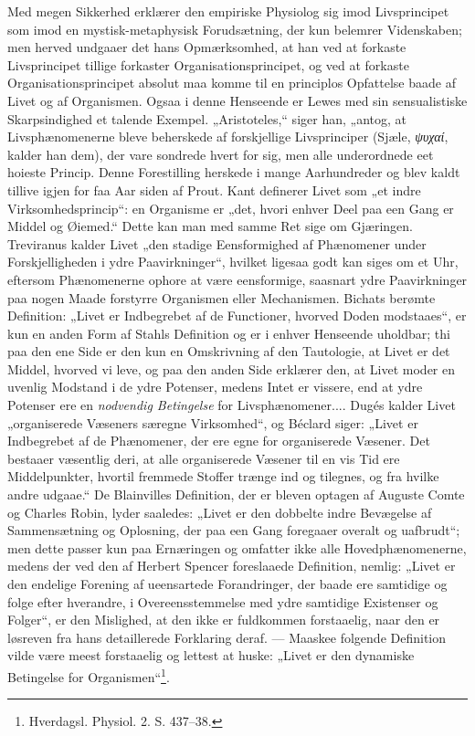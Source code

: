 \documentclass[11pt]{book}
\newcommand{\opage}[1]{\marginnote{\footnotesize\textit{[#1]}}}
\begin{document}
Med megen Sikkerhed erklærer den empiriske Physiolog sig imod
Livsprincipet som imod en mystisk-metaphysisk Forudsætning, der kun
belemrer Videnskaben; men herved undgaaer det hans Opmærksomhed,
at han ved at forkaste Livsprincipet tillige forkaster
Organisationsprincipet, og ved at
\opage{348} \setcounter{footnote}{0}%
forkaste Organisationsprincipet absolut maa komme til en principlos
Opfattelse baade af Livet og af Organismen. Ogsaa i denne Henseende
er Lewes med sin sensualistiske Skarpsindighed et talende Exempel.
„Aristoteles,“ siger han, „antog, at Livsphænomenerne bleve beherskede
af forskjellige Livsprinciper (Sjæle, \textit{ψυχαί}, kalder han dem), der
vare sondrede hvert for sig, men alle underordnede eet hoieste Princip.
Denne Forestilling herskede i mange Aarhundreder og blev kaldt tillive
igjen for faa Aar siden af Prout. Kant definerer Livet som „et indre
Virksomhedsprincip“: en Organisme er „det, hvori enhver Deel paa een
Gang er Middel og Øiemed.“ Dette kan man med samme Ret sige om
Gjæringen. Treviranus kalder Livet „den stadige Eensformighed af
Phænomener under Forskjelligheden i ydre Paavirkninger“, hvilket ligesaa
godt kan siges om et Uhr, eftersom Phænomenerne ophore at være
eensformige, saasnart ydre Paavirkninger paa nogen Maade forstyrre
Organismen eller Mechanismen. Bichats berømte Definition: „Livet er
Indbegrebet af de Functioner, hvorved Doden modstaaes“, er kun en
anden Form af Stahls Definition og er i enhver Henseende uholdbar;
thi paa den ene Side er den kun en Omskrivning af den Tautologie, at
Livet er det Middel, hvorved vi leve, og paa den anden Side erklærer
den, at Livet moder en uvenlig Modstand i de ydre Potenser, medens
Intet er vissere, end at ydre Potenser ere en \emph{nodvendig Betingelse}
for Livsphænomener.... Dugés kalder Livet „organiserede Væseners
særegne Virksomhed“, og Béclard siger: „Livet er Indbegrebet af de
Phænomener, der ere egne for organiserede Væsener. Det bestaaer
væsentlig deri, at alle organiserede Væsener til en vis Tid ere
Middelpunkter, hvortil fremmede Stoffer trænge ind og tilegnes, og fra
hvilke andre udgaae.“ De Blainvilles Definition, der er bleven optagen
af Auguste Comte og Charles Robin, lyder saaledes: „Livet er den
dobbelte indre Bevægelse af Sammensætning og Oplosning,
\opage{349} \setcounter{footnote}{0}%
der paa een Gang foregaaer overalt og uafbrudt“; men dette passer kun
paa Ernæringen og omfatter ikke alle Hovedphænomenerne, medens der
ved den af Herbert Spencer foreslaaede Definition, nemlig: „Livet er
den endelige Forening af ueensartede Forandringer, der baade ere
samtidige og folge efter hverandre, i Overeensstemmelse med ydre
samtidige Existenser og Folger“, er den Mislighed, at den ikke er
fuldkommen forstaaelig, naar den er løsreven fra hans detaillerede
Forklaring deraf. --- Maaskee folgende Definition vilde være meest
forstaaelig og lettest at huske: „Livet er den dynamiske Betingelse for
Organismen“\footnote{Hverdagsl. Physiol. 2. S. 437--38.}.
\end{document}
